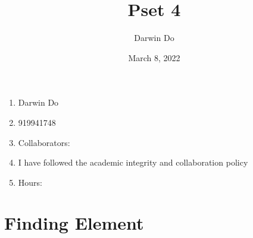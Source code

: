 \documentclass{article}
\title{Pset 4}
\begin{document}
\newcommand{\Not}{\textbf{not}}

\date{March 8, 2022 }
\author{Darwin Do}

\maketitle

\begin{enumerate}
    \item Darwin Do
    \item 919941748
    \item Collaborators: 
    \item I have followed the academic integrity and collaboration policy
    \item Hours: 
\end{enumerate}

\newpage

\section{Finding Element}
\end{document}
